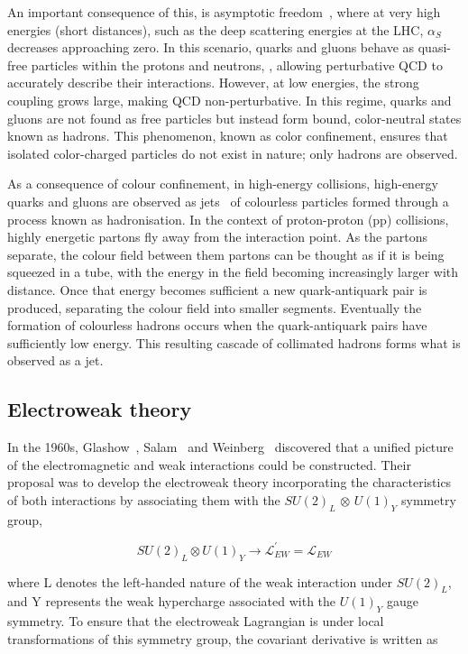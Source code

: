 An important consequence of this, is asymptotic freedom~\cite{AsymptoticFreedom_1,AsymptoticFreedom_2}, where at very high energies (short distances), such as the deep scattering energies at the LHC, $\alpha_{S}$ decreases approaching zero. In this scenario, quarks and gluons behave as quasi-free particles within the protons and neutrons, , allowing perturbative QCD to accurately describe their interactions. However, at low energies, the strong coupling grows large, making QCD non-perturbative. In this regime, quarks and gluons are not found as free particles but instead form bound, color-neutral states known as hadrons. This phenomenon, known as color confinement, ensures that isolated color-charged particles do not exist in nature; only hadrons are observed.

As a consequence of colour confinement, in high-energy collisions, high-energy quarks and gluons are observed as jets~\cite{Hadronisation_Jets} of colourless particles formed through a process known as hadronisation. In the context of proton-proton (pp) collisions, highly energetic partons fly away from the interaction point. As the partons separate, the colour field between them partons can be thought as if it is being squeezed in a tube, with the energy in the field becoming increasingly larger with distance. Once that energy becomes sufficient a new quark-antiquark pair is produced, separating the colour field into smaller segments. Eventually the formation of colourless hadrons occurs when the quark-antiquark pairs have sufficiently low energy. This resulting cascade of collimated hadrons forms what is observed as a jet.

\subsection{Electroweak theory}

In the 1960s, Glashow~\cite{Glashow}, Salam~\cite{Salam} and Weinberg~\cite{Weinberg} discovered that a unified picture of the electromagnetic and weak interactions could be constructed. Their proposal was to develop the electroweak theory incorporating the characteristics of both interactions by associating them with the $SU(2)_{L}$ $\otimes$ $U(1)_{Y}$ symmetry group,

\begin{equation}
    SU(2)_L \otimes U(1)_Y \rightarrow \mathcal{L}^{\prime}_{EW} = \mathcal{L}_{EW}
\end{equation}

where L denotes the left-handed nature of the weak interaction under $SU(2)_L$, and Y represents the weak hypercharge associated with the $U(1)_Y$ gauge symmetry. To ensure that the electroweak Lagrangian is under local transformations of this symmetry group, the covariant derivative is written as

